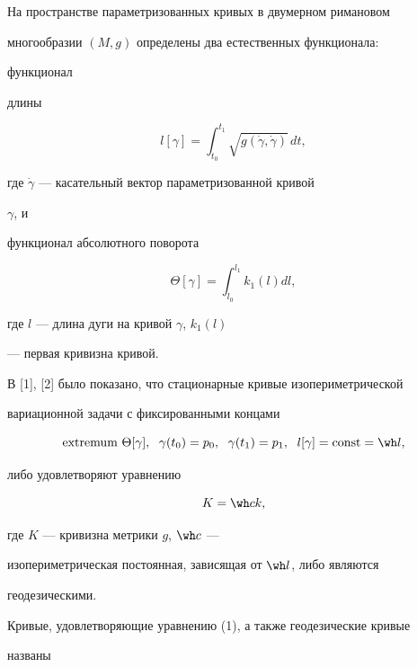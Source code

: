 \label{begin} 


 


На пространстве параметризованных кривых в двумерном римановом 


многообразии $(M,g)$ определены два естественных функционала: 


функционал 


длины 


$$ 


l[\gamma]=\int^{t_1}_{t_0}\sqrt{g(\Dot\gamma,\Dot\gamma)}\,dt, 


$$ 


где $\Dot\gamma$ --- касательный вектор параметризованной кривой 


$\gamma$, и 


функционал абсолютного поворота 


$$ 


\Theta[\gamma]=\int^{l_1}_{l_0}k_1(l)d l, 


$$ 


где $l$ --- длина дуги на кривой $\gamma$, $k_1(l)$


--- первая кривизна кривой. 


 


В [1], [2] было показано, что стационарные кривые изопериметрической 


вариационной задачи с фиксированными концами 


$$ 


\text{extremum }\Theta[\gamma],\ \; \gamma(t_0)=p_0, 


\ \; \gamma(t_1)=p_1,\ \; l[\gamma]=\const=\wh l, 


$$ 


либо удовлетворяют уравнению 


\begin{equation} 


K=\wh c k, 


\end{equation} 


где $K$ --- кривизна метрики $g$, $\wh c$ --- 


изопериметрическая постоянная, зависящая от $\wh l$, либо являются 


геодезическими. 


 


Кривые, удовлетворяющие уравнению (1), а также геодезические кривые 


названы 


